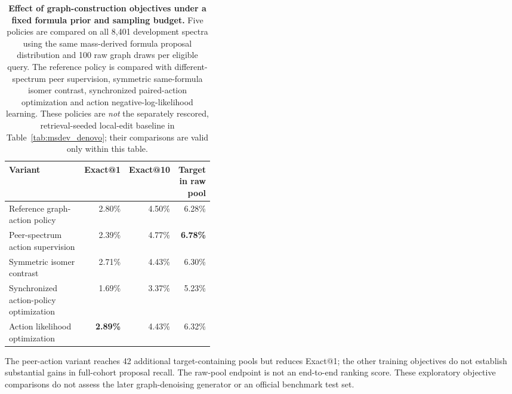 \begin{table}[!htbp]
\centering
\caption{\textbf{Effect of graph-construction objectives under a fixed formula prior and sampling budget.} Five policies are compared on all 8,401 development spectra using the same mass-derived formula proposal distribution and 100 raw graph draws per eligible query. The reference policy is compared with different-spectrum peer supervision, symmetric same-formula isomer contrast, synchronized paired-action optimization and action negative-log-likelihood learning. These policies are \emph{not} the separately rescored, retrieval-seeded local-edit baseline in Table~\ref{tab:msdev_denovo}; their comparisons are valid only within this table.}
\label{tab:msdev_gablation}
\small
\setlength{\tabcolsep}{4pt}
\begin{tabular}{p{0.40\linewidth}rrr}
\toprule
Variant & Exact@1 & Exact@10 & Target in raw pool \\
\midrule
Reference graph-action policy & 2.80\% & 4.50\% & 6.28\% \\
Peer-spectrum action supervision & 2.39\% & 4.77\% & \textbf{6.78\%} \\
Symmetric isomer contrast & 2.71\% & 4.43\% & 6.30\% \\
Synchronized action-policy optimization & 1.69\% & 3.37\% & 5.23\% \\
Action likelihood optimization & \textbf{2.89\%} & 4.43\% & 6.32\% \\
\bottomrule
\end{tabular}
\vspace{3pt}
\begin{minipage}{0.97\linewidth}\footnotesize
The peer-action variant reaches 42 additional target-containing pools but reduces Exact@1; the other training objectives do not establish substantial gains in full-cohort proposal recall. The raw-pool endpoint is not an end-to-end ranking score. These exploratory objective comparisons do not assess the later graph-denoising generator or an official benchmark test set.
\end{minipage}
\end{table}


